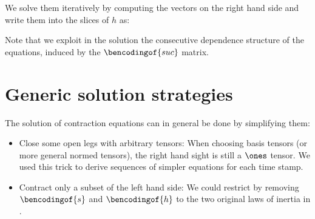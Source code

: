 \documentclass[aps,onecolumn,nofootinbib,pra]{article}
\begin{document}
    We solve them iteratively by computing the vectors on the right hand side and write them into the slices of $h$ as:

    Note that we exploit in the solution the consecutive dependence structure of the equations, induced by the $\bencodingof{suc}$ matrix.

    \section{Generic solution strategies}

    The solution of contraction equations can in general be done by simplifying them:
    \begin{itemize}
        \item Close some open legs with arbitrary tensors: When choosing basis tensors (or more general normed tensors), the right hand sight is still a $\ones$ tensor.
        We used this trick to derive sequences of simpler equations for each time stamp.
        \item Contract only a subset of the left hand side: We could restrict by removing $\bencodingof{s}$ and $\bencodingof{h}$ to the two original laws of inertia in \cite{tsilionis_tensor-based_2024}.
    \end{itemize}

    
    
\end{document}
